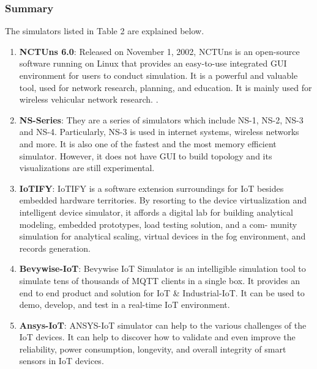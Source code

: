 \documentclass[a4paper,11pt]{article}
\begin{document}
\begin{iotsolution}
\begin{center}
\end{center}

\subsubsection*{Summary}

  The simulators listed in Table 2 are explained below.
\begin{enumerate}
    \item \textbf{NCTUns 6.0}: Released on November 1, 2002, NCTUns is an open-source software running on Linux that provides an easy-to-use integrated GUI environment for users to conduct simulation. It is a powerful and valuable tool, used for network research, planning, and education. It is mainly used for wireless vehicular network research. \cite{NCTUns}.
    \item \textbf{NS-Series}: They are a series of simulators which include NS-1, NS-2, NS-3 and NS-4. Particularly, NS-3 is used in internet systems, wireless networks and more. It is also one of the fastest and the most memory efficient simulator. However, it does not have GUI to build topology and its visualizations are still experimental. \cite{Simulators}
    \item \textbf{IoTIFY}: IoTIFY is a software extension surroundings for IoT besides embedded hardware territories. By resorting to the device virtualization and intelligent device simulator, it affords a digital lab for building analytical modeling, embedded prototypes, load testing solution, and a com- munity simulation for analytical scaling, virtual devices in the fog environment, and records generation. \cite{Simulators}
    \item \textbf{Bevywise-IoT}: Bevywise IoT Simulator is an intelligible simulation tool to simulate tens of thousands of MQTT clients in a single box. It provides an end to end product and solution for IoT \& Industrial-IoT. It can be used to demo, develop, and test in a real-time IoT environment. \cite{Simulators}
    \item \textbf{Ansys-IoT}: ANSYS-IoT simulator can help to the various challenges of the IoT devices. It can help to discover how to validate and even improve the reliability, power consumption, longevity, and overall integrity of smart sensors in IoT devices. \cite{Simulators}
\end{enumerate}

%

\end{iotsolution}
\end{document}
